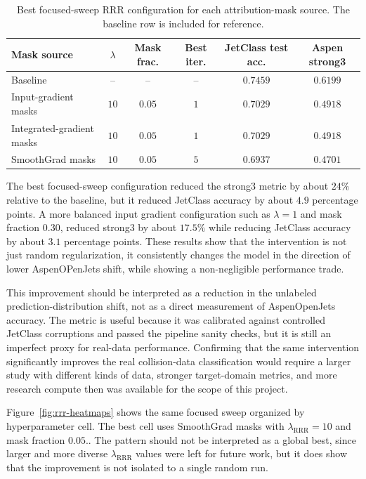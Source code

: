 \begin{table}[t]
\centering
\caption{Best focused-sweep RRR configuration for each attribution-mask source. The baseline row is included for reference.}
\label{tab:rrr-best-source}
\begin{tabular}{lccccc}
\toprule
Mask source & $\lambda$ & Mask frac. & Best iter. & JetClass test acc. & Aspen strong3 \\
\midrule
Baseline & -- & -- & -- & $0.7459$ & $0.6199$ \\
Input-gradient masks & $10$ & $0.05$ & $1$ & $0.7029$ & $0.4918$ \\
Integrated-gradient masks & $10$ & $0.05$ & $1$ & $0.7029$ & $0.4918$ \\
SmoothGrad masks & $10$ & $0.05$ & $5$ & $0.6937$ & $0.4701$ \\
\bottomrule
\end{tabular}
\end{table}

The best focused-sweep configuration reduced the strong3 metric by about $24\%$ relative to the baseline, but it reduced JetClass accuracy by about $4.9$ percentage points. A more balanced input gradient configuration such as $\lambda=1$ and mask fraction $0.30$, reduced strong3 by about $17.5\%$ while reducing JetClass accuracy by about $3.1$ percentage points. These results show that the intervention is not just random regularization, it consistently changes the model in the direction of lower AspenOPenJets shift, while showing a non-negligible performance trade.

This improvement should be interpreted as a reduction in the unlabeled prediction-distribution shift, not as a direct measurement of AspenOpenJets accuracy. The metric is useful because it was calibrated against controlled JetClass corruptions and passed the pipeline sanity checks, but it is still an imperfect proxy for real-data performance. Confirming that the same intervention significantly improves the real collision-data classification would require a larger study with different kinds of data, stronger target-domain metrics, and more research compute then was available for the scope of this project.

Figure~\ref{fig:rrr-heatmaps} shows the same focused sweep organized by hyperparameter cell. The best cell uses SmoothGrad masks with $\lambda_{\mathrm{RRR}}=10$ and mask fraction $0.05$.. The pattern should not be interpreted as a global best, since larger and more diverse $\lambda_{\mathrm{RRR}}$ values were left for future work, but it does show that the improvement is not isolated to a single random run.


